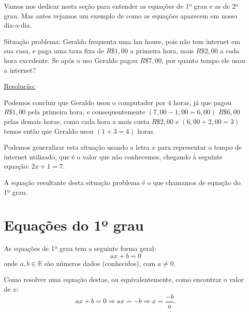 Vamos nos dedicar nesta seção para entender as equações de 1º grau e as de 2º grau. Mas antes vejamos um exemplo de como as equações aparecem em nosso dia-a-dia.

\begin{exem}
 Situação problema: Geraldo frequenta uma lan house, pois não tem internet em sua casa, e paga uma taxa fixa de $R\$ 1,00$ a primeira hora, mais $R\$ 2,00$ a cada hora excedente. Se após o uso Geraldo pagou $R\$ 7,00$, por quanto tempo ele usou a internet?

 \underline{Resolução:}

 Podemos concluir que Geraldo usou o computador por $4$ horas, já que pagou $R\$ 1,00$ pela primeira hora, e consequentemente $(7,00 - 1,00 = 6,00)$ $R\$ 6,00$ pelas demais horas, como cada hora a mais custa $R\$ 2,00$ e $(6,00 \div 2,00 = 3)$ temos então que Geraldo usou $(1 + 3 = 4)$ horas.

 Podemos generalizar esta situação usando a letra $x$ para representar o tempo de internet utilizado, que é o valor que não conhecemos, chegando à seguinte equação: $2x + 1 = 7$.
\end{exem}

A equação resultante desta situação problema é o que chamamos de equação do 1º grau.

\section{Equações do 1º grau}

\colorbox{azul}{
 \begin{minipage}{0.9\linewidth}
 \begin{center}
   As equações de 1º grau tem a seguinte forma geral:
\begin{equation}
ax + b = 0
\end{equation}
onde $a, b \in \mathbb{R}$ são números dados (conhecidos), com $a \neq 0 $.
 \end{center}
 \end{minipage}}

 \vskip0.3cm

Como resolver uma equação destas, ou equivalentemente, como encontrar o valor de $x$:
\begin{equation}
ax + b = 0 \Rightarrow ax= -b \Rightarrow x = \frac{-b}{a} .
\end{equation}



